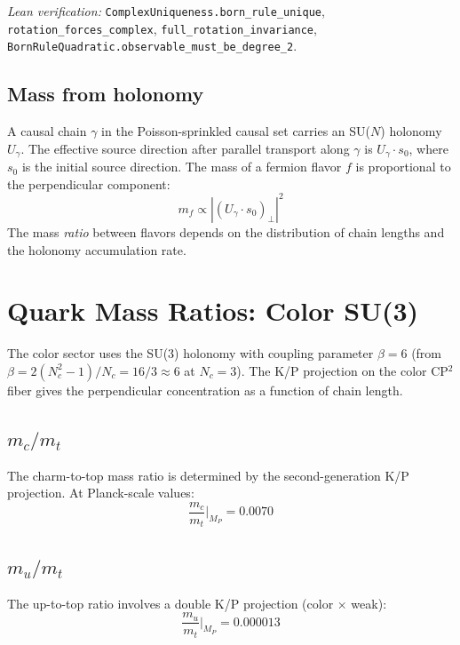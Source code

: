 \documentclass[11pt,letterpaper]{article}
\begin{document}
\noindent\textit{Lean verification:}
\texttt{Complex\-Uniqueness.born\_rule\_unique},
\texttt{rotation\_forces\_\allowbreak complex},
\texttt{full\_rotation\_\allowbreak invariance},
\texttt{BornRule\-Quadratic.observable\_must\_be\_degree\_2}.

\subsection{Mass from holonomy}

A causal chain $\gamma$ in the Poisson-sprinkled causal set carries an
SU($N$) holonomy $U_\gamma$. The effective source direction after
parallel transport along $\gamma$ is $U_\gamma \cdot s_0$, where $s_0$
is the initial source direction. The mass of a fermion flavor $f$ is
proportional to the perpendicular component:
\[
  m_f \propto \left| (U_\gamma \cdot s_0)_\perp \right|^2
\]
The mass \emph{ratio} between flavors depends on the distribution of
chain lengths and the holonomy accumulation rate.

\section{Quark Mass Ratios: Color SU(3)}

The color sector uses the SU(3) holonomy with coupling parameter
$\beta = 6$ (from $\beta = 2(N_c^2 - 1)/N_c = 16/3 \approx 6$ at
$N_c = 3$). The K/P projection on the color CP$^2$ fiber gives the
perpendicular concentration as a function of chain length.

\subsection{$m_c/m_t$}

The charm-to-top mass ratio is determined by the second-generation
K/P projection. At Planck-scale values:
\[
  \frac{m_c}{m_t}\bigg|_{M_P} = 0.0070
\]

\subsection{$m_u/m_t$}

The up-to-top ratio involves a double K/P projection (color $\times$
weak):
\[
  \frac{m_u}{m_t}\bigg|_{M_P} = 0.000013
\]

\end{document}
